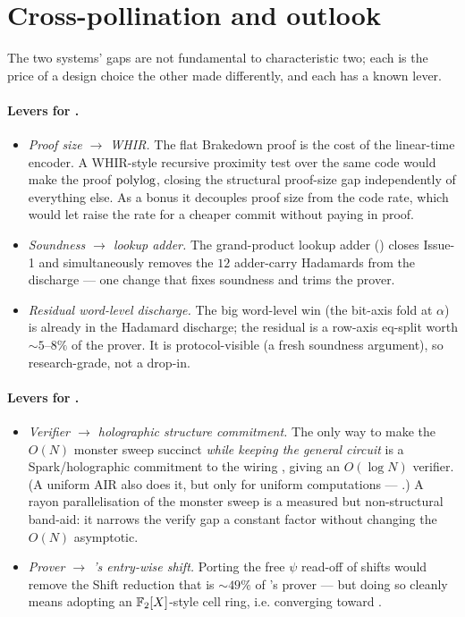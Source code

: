 \section{Cross-pollination and outlook}
\label{sec:cmp-outlook}

The two systems' gaps are not fundamental to characteristic two; each is
the price of a design choice the other made differently, and each has a
known lever.

\paragraph{Levers for \zinc{}.}
\begin{itemize}
  \item \emph{Proof size $\to$ WHIR.} The flat Brakedown proof is the
  cost of the linear-time encoder. A WHIR-style recursive proximity test
  \cite{whir} over the same code would make the proof $\operatorname{polylog}$,
  closing the structural proof-size gap independently of everything else.
  As a bonus it decouples proof size from the code rate, which would let
  \zinc{} raise the rate for a cheaper commit without paying in proof.
  \item \emph{Soundness $\to$ lookup adder.} The grand-product lookup
  adder () closes Issue-1 and simultaneously removes
  the $12$ adder-carry Hadamards from the discharge --- one change that
  fixes soundness and trims the prover.
  \item \emph{Residual word-level discharge.} The big word-level win (the
  bit-axis fold at $\alpha$) is already in the Hadamard discharge; the
  residual is a row-axis eq-split worth $\sim$$5$--$8\%$ of the prover. It
  is protocol-visible (a fresh soundness argument), so research-grade, not
  a drop-in.
\end{itemize}

\paragraph{Levers for \binius{}.}
\begin{itemize}
  \item \emph{Verifier $\to$ holographic structure commitment.} The only
  way to make the $O(N)$ monster sweep succinct \emph{while keeping the
  general circuit} is a Spark/holographic commitment to the wiring
  \cite{spartan,lasso}, giving an $O(\log N)$ verifier. (A uniform AIR
  also does it, but only for uniform computations --- .)
  A rayon parallelisation of the monster sweep is a measured but
  non-structural band-aid: it narrows the verify gap a constant factor
  without changing the $O(N)$ asymptotic.
  \item \emph{Prover $\to$ \zinc{}'s entry-wise shift.} Porting the free
  $\psi$ read-off of shifts would remove the Shift reduction that is
  $\sim$$49\%$ of \binius{}'s prover --- but doing so cleanly means
  adopting an $\mathbb{F}_2[X]$-style cell ring, i.e. converging toward \zinc{}.
\end{itemize}


